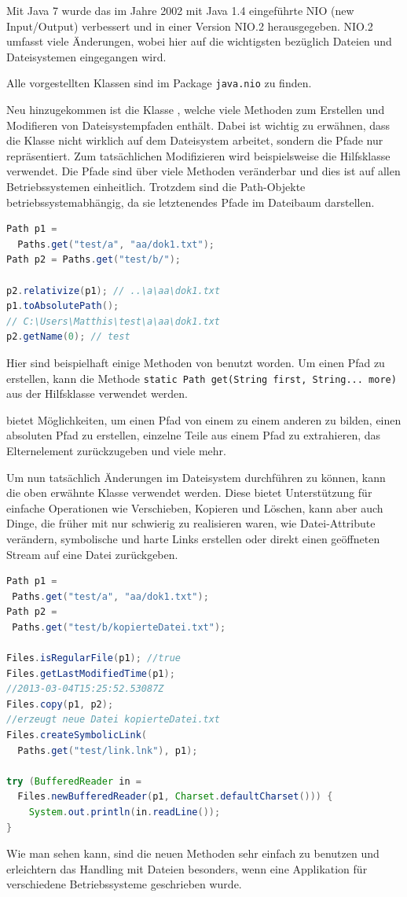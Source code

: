 \documentclass[times, 10pt,twocolumn]{article}
\begin{document}
Mit Java 7 wurde das im Jahre 2002 mit Java 1.4 eingeführte NIO (new Input/Output) verbessert und in einer Version NIO.2
herausgegeben.\cite{v2bJava7} NIO.2 umfasst viele Änderungen, wobei hier auf die wichtigsten bezüglich Dateien und
Dateisystemen eingegangen wird.

Alle vorgestellten Klassen sind im Package \texttt{java.nio} zu finden.

Neu hinzugekommen ist die Klasse , welche viele Methoden zum Erstellen und Modifieren von Dateisystempfaden enthält. Dabei ist
wichtig zu erwähnen, dass die Klasse nicht wirklich auf dem Dateisystem arbeitet, sondern die Pfade nur repräsentiert. Zum tatsächlichen
Modifizieren wird beispielsweise die Hilfsklasse  verwendet. Die Pfade sind über viele Methoden veränderbar und dies ist auf
allen Betriebssystemen einheitlich. Trotzdem sind die Path-Objekte betriebssystemabhängig, da sie letztenendes Pfade 
im Dateibaum darstellen.
\begin{lstlisting}[language=java,breaklines=true]
Path p1 = 
  Paths.get("test/a", "aa/dok1.txt");
Path p2 = Paths.get("test/b/");

p2.relativize(p1); // ..\a\aa\dok1.txt
p1.toAbsolutePath(); 
// C:\Users\Matthis\test\a\aa\dok1.txt
p2.getName(0); // test
\end{lstlisting}
Hier sind beispielhaft einige Methoden von  benutzt worden. Um einen Pfad zu erstellen, kann die 
Methode \texttt{static Path get(String first, String... more)} aus der Hilfsklasse  verwendet werden.

 bietet Möglichkeiten, um einen Pfad von einem zu einem anderen zu bilden, einen absoluten Pfad zu erstellen,
einzelne Teile aus einem Pfad zu extrahieren, das Elternelement zurückzugeben und viele mehr.

Um nun tatsächlich Änderungen im Dateisystem durchführen zu können, kann die oben erwähnte Klasse  verwendet werden.
Diese bietet Unterstützung für einfache Operationen wie Verschieben, Kopieren und Löschen, kann aber auch Dinge, die früher
mit  nur schwierig zu realisieren waren, wie Datei-Attribute verändern, symbolische und harte Links erstellen oder
direkt einen geöffneten Stream auf eine Datei zurückgeben.\cite{b247nio2}
\begin{lstlisting}[language=java,breaklines=true]
Path p1 = 
 Paths.get("test/a", "aa/dok1.txt");
Path p2 = 
 Paths.get("test/b/kopierteDatei.txt");

Files.isRegularFile(p1); //true
Files.getLastModifiedTime(p1); 
//2013-03-04T15:25:52.53087Z
Files.copy(p1, p2); 
//erzeugt neue Datei kopierteDatei.txt
Files.createSymbolicLink(
  Paths.get("test/link.lnk"), p1);

try (BufferedReader in = 
  Files.newBufferedReader(p1, Charset.defaultCharset())) {
	System.out.println(in.readLine());
}
\end{lstlisting}
Wie man sehen kann, sind die neuen Methoden sehr einfach zu benutzen und erleichtern das Handling mit Dateien besonders,
wenn eine Applikation für verschiedene Betriebssysteme geschrieben wurde.
\end{document}
